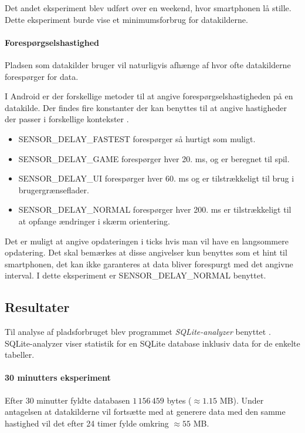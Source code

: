 Det andet eksperiment blev udført over en weekend, hvor smartphonen lå stille.
Dette eksperiment burde vise et minimumsforbrug for datakilderne.

\paragraph{Forespørgselshastighed}
Pladsen som datakilder bruger vil naturligvis afhænge af hvor ofte datakilderne forespørger for data.

I Android er der forskellige metoder til at angive forespørgselshastigheden på en datakilde.
Der findes fire konstanter der kan benyttes til at angive hastigheder der passer i forskellige kontekster \cite{sensormonitor}.

\begin{itemize}
	\item SENSOR\_DELAY\_FASTEST forespørger så hurtigt som muligt.
	\item SENSOR\_DELAY\_GAME forespørger hver 20. ms, og er beregnet til spil.
	\item SENSOR\_DELAY\_UI forespørger hver 60. ms og er tilstrækkeligt til brug i brugergrænseflader.
	\item SENSOR\_DELAY\_NORMAL forespørger hver 200. ms er tilstrækkeligt til at opfange ændringer i skærm orientering.
\end{itemize}

Det er muligt at angive opdateringen i ticks hvis man vil have en langsommere opdatering.
Det skal bemærkes at disse angivelser kun benyttes som et hint til smartphonen, det kan ikke garanteres at data bliver forespurgt med det angivne interval.
I dette eksperiment er SENSOR\_DELAY\_NORMAL benyttet.

\subsection{Resultater}
Til analyse af pladsforbruget blev programmet \textit{SQLite-analyzer} benyttet \cite{sqliteanalyzer}.
SQLite-analyzer viser statistik for en SQLite database inklusiv data for de enkelte tabeller.

\paragraph{30 minutters eksperiment}
Efter 30 minutter fyldte databasen $1\,156\,459$ bytes ($\approx1.15$ MB).
Under antagelsen at datakilderne vil fortsætte med at generere data med den samme hastighed vil det efter 24 timer fylde omkring $\approx55$ MB. 

